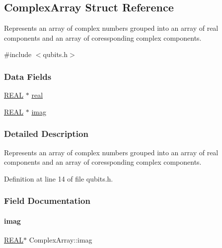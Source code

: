 \hypertarget{structComplexArray}{}\subsection{Complex\+Array Struct Reference}
\label{structComplexArray}


Represents an array of complex numbers grouped into an array of real components and an array of coressponding complex components.  




{\ttfamily \#include $<$qubits.\+h$>$}

\subsubsection*{Data Fields}
\begin{DoxyCompactItemize}
\item 
\mbox{\hyperlink{precision_8h_a4b654506f18b8bfd61ad2a29a7e38c25}{R\+E\+AL}} $\ast$ \mbox{\hyperlink{structComplexArray_a4195cac6c784ea1b6271f1c7dba1548a}{real}}
\item 
\mbox{\hyperlink{precision_8h_a4b654506f18b8bfd61ad2a29a7e38c25}{R\+E\+AL}} $\ast$ \mbox{\hyperlink{structComplexArray_a79dde47c7ae530c79cebfdf57b225968}{imag}}
\end{DoxyCompactItemize}


\subsubsection{Detailed Description}
Represents an array of complex numbers grouped into an array of real components and an array of coressponding complex components. 

Definition at line 14 of file qubits.\+h.



\subsubsection{Field Documentation}
\mbox{\label{structComplexArray_a79dde47c7ae530c79cebfdf57b225968}} 
\paragraph{\texorpdfstring{imag}{imag}}
{\footnotesize\ttfamily \mbox{\hyperlink{precision_8h_a4b654506f18b8bfd61ad2a29a7e38c25}{R\+E\+AL}}$\ast$ Complex\+Array\+::imag}



